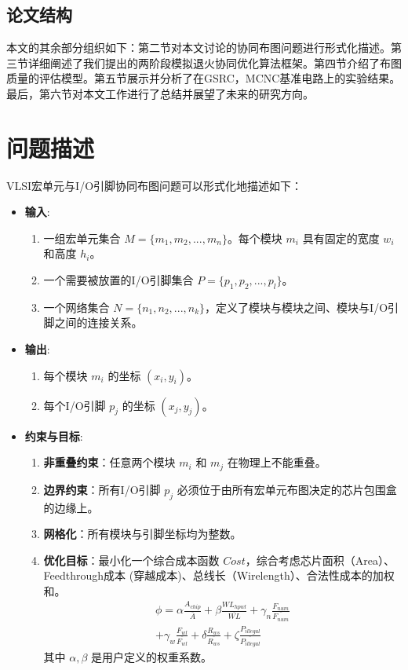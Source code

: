 \documentclass[conference]{IEEEtran}
\begin{document}
\subsection{论文结构}
本文的其余部分组织如下：第二节对本文讨论的协同布图问题进行形式化描述。第三节详细阐述了我们提出的两阶段模拟退火协同优化算法框架。第四节介绍了布图质量的评估模型。第五节展示并分析了在GSRC，MCNC基准电路上的实验结果。最后，第六节对本文工作进行了总结并展望了未来的研究方向。

\section{问题描述}
VLSI宏单元与I/O引脚协同布图问题可以形式化地描述如下：
\begin{itemize}
    \item \textbf{输入}:
    \begin{enumerate}
        \item 一组宏单元集合 $M = \{m_1, m_2, ..., m_n\}$。每个模块 $m_i$ 具有固定的宽度 $w_i$ 和高度 $h_i$。
        \item 一个需要被放置的I/O引脚集合 $P = \{p_1, p_2, ..., p_l\}$。
        \item 一个网络集合 $N = \{n_1, n_2, ..., n_k\}$，定义了模块与模块之间、模块与I/O引脚之间的连接关系。
    \end{enumerate}
    \item \textbf{输出}:
    \begin{enumerate}
        \item 每个模块 $m_i$ 的坐标 $(x_i, y_i)$。
        \item 每个I/O引脚 $p_j$ 的坐标 $(x_j, y_j)$。
    \end{enumerate}
    \item \textbf{约束与目标}:
    \begin{enumerate}
        \item \textbf{非重叠约束}：任意两个模块 $m_i$ 和 $m_j$ 在物理上不能重叠。
        \item \textbf{边界约束}：所有I/O引脚 $p_j$ 必须位于由所有宏单元布图决定的芯片包围盒的边缘上。
        \item \textbf{网格化}：所有模块与引脚坐标均为整数。
        \item \textbf{优化目标}：最小化一个综合成本函数 $Cost$，综合考虑芯片面积（Area）、Feedthrough成本 (穿越成本)、总线长（Wirelength）、合法性成本的加权和。
        \begin{multline}
        \label{eq:comprehensive_cost}
        \phi = \alpha \frac{A_{chip}}{\overline{A}} + 
            \beta \frac{WL_{hpwl}}{\overline{WL}} + 
            \gamma_n \frac{F_{num}}{\overline{F_{num}}} \\
            + \gamma_w \frac{F_{wl}}{\overline{F_{wl}}} + 
            \delta \frac{R_{ws}}{\overline{R_{ws}}} + 
            \zeta \frac{P_{illegal}}{\overline{P_{illegal}}}
        \end{multline}
        其中 $\alpha, \beta$ 是用户定义的权重系数。
    \end{enumerate}
\end{itemize}
\end{document}

